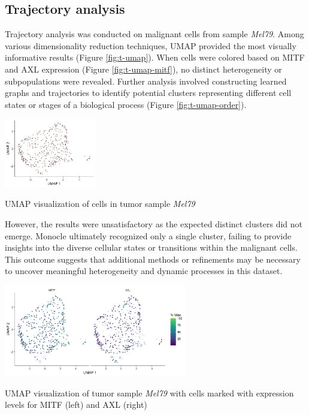 \documentclass[11pt]{article}
\begin{document}
\subsection{Trajectory analysis}
\begin{multicols}{2}
    \noindent
    Trajectory analysis was conducted on malignant cells from sample \textit{Mel79}. Among various dimensionality reduction techniques, UMAP provided the most visually informative results (Figure \ref{fig:t-umap}). When cells were colored based on MITF and AXL expression (Figure \ref{fig:t-umap-mitf}), no distinct heterogeneity or subpopulations were revealed. Further analysis involved constructing learned graphs and trajectories to identify potential clusters representing different cell states or stages of a biological process (Figure \ref{fig:t-umap-order}).

    \begin{center}
        \captionsetup{type=figure}
        \includegraphics[width=4cm]{plots/plot_t-umap.png}
        \caption{UMAP visualization of cells in tumor sample \textit{Mel79}}
        \label{fig:t-umap}
    \end{center}

    However, the results were unsatisfactory as the expected distinct clusters did not emerge. Monocle ultimately recognized only a single cluster, failing to provide insights into the diverse cellular states or transitions within the malignant cells. This outcome suggests that additional methods or refinements may be necessary to uncover meaningful heterogeneity and dynamic processes in this dataset.

    \begin{center}
        \captionsetup{type=figure}
        \includegraphics[width=8cm]{plots/plot_t-umap-mitf-axl.png}
        \caption{UMAP visualization of tumor sample \textit{Mel79} with cells marked with expression levels for MITF (left) and AXL (right)}
        \label{fig:t-umap-mitf}
    \end{center}


\end{multicols}
\end{document}
